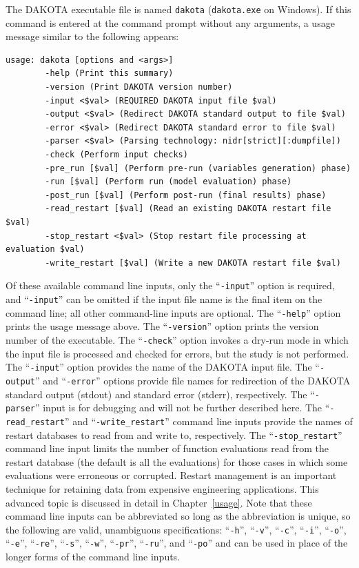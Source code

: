 The DAKOTA executable file is named {\tt dakota} ({\tt dakota.exe} on
Windows). If this command is entered at the command prompt without any
arguments, a usage message similar to the following appears:
\begin{small}
\begin{verbatim}
usage: dakota [options and <args>]
        -help (Print this summary)
        -version (Print DAKOTA version number)
        -input <$val> (REQUIRED DAKOTA input file $val)
        -output <$val> (Redirect DAKOTA standard output to file $val)
        -error <$val> (Redirect DAKOTA standard error to file $val)
        -parser <$val> (Parsing technology: nidr[strict][:dumpfile])
        -check (Perform input checks)
        -pre_run [$val] (Perform pre-run (variables generation) phase)
        -run [$val] (Perform run (model evaluation) phase)
        -post_run [$val] (Perform post-run (final results) phase)
        -read_restart [$val] (Read an existing DAKOTA restart file $val)
        -stop_restart <$val> (Stop restart file processing at evaluation $val)
        -write_restart [$val] (Write a new DAKOTA restart file $val)
\end{verbatim}
\end{small}

Of these available command line inputs, only the ``\texttt{-input}''
option is required, and ``\texttt{-input}'' can be omitted if the
input file name is the final item on the command line; all other
command-line inputs are optional. The ``\texttt{-help}'' option prints
the usage message above. The ``\texttt{-version}'' option prints the
version number of the executable. The ``\texttt{-check}'' option
invokes a dry-run mode in which the input file is processed and
checked for errors, but the study is not performed. The
``\texttt{-input}'' option provides the name of the DAKOTA input file.
The ``\texttt{-output}'' and ``\texttt{-error}'' options provide file
names for redirection of the DAKOTA standard output (stdout) and
standard error (stderr), respectively.  The ``\texttt{-parser}'' input
is for debugging and will not be further described here.  The
``\texttt{-read\_restart}'' and ``\texttt{-write\_restart}'' command
line inputs provide the names of restart databases to read from and
write to, respectively. The ``\texttt{-stop\_restart}'' command line
input limits the number of function evaluations read from the restart
database (the default is all the evaluations) for those cases in which
some evaluations were erroneous or corrupted. Restart management is an
important technique for retaining data from expensive engineering
applications. This advanced topic is discussed in detail in
Chapter~\ref{usage}. Note that these command line inputs can be
abbreviated so long as the abbreviation is unique, so the following
are valid, unambiguous specifications: ``\texttt{-h}'',
``\texttt{-v}'', ``\texttt{-c}'', ``\texttt{-i}'', ``\texttt{-o}'',
``\texttt{-e}'', ``\texttt{-re}'', ``\texttt{-s}'', ``\texttt{-w}'',
``\texttt{-pr}'', ``\texttt{-ru}'', and ``\texttt{-po}'' and can be
used in place of the longer forms of the command line inputs.

